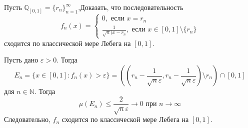 \begin{task}{4}
Пусть  $\mathbb{Q}_[0, 1] = \{r_n\}_{n=1}^{\infty}$,Доказать, что последовательность 
$$f_n(x) = 
\begin{cases}
0, \text{ если } x=r_n \\
\frac{1}{\sqrt{n}(x - r_n}, \text{ если } x \in [0, 1] \setminus \{r_n\}
\end{cases}$$ сходится по классической мере Лебега на $[0, 1]$.
\end{task}

\begin{solution}
Пусть дано $\varepsilon > 0$. Тогда
$$E_n = \{ x \in [0, 1]: f_n(x) > \varepsilon\} = \left( \left(r_n - \dfrac{1}{\sqrt{n}\varepsilon}, r_n - \dfrac{1}{\sqrt{n}\varepsilon} \right) \setminus {r_n} \right) \cap [0, 1] $$
для $n \in \mathbb{N}$. Тогда
$$ \mu(E_n) \leqslant \dfrac{2}{\sqrt{n}\varepsilon} \to 0 \text{ при } n \to \infty $$
Следовательно, $f_n$ сходится по классической мере Лебега на $[0, 1]$.
\end{solution}